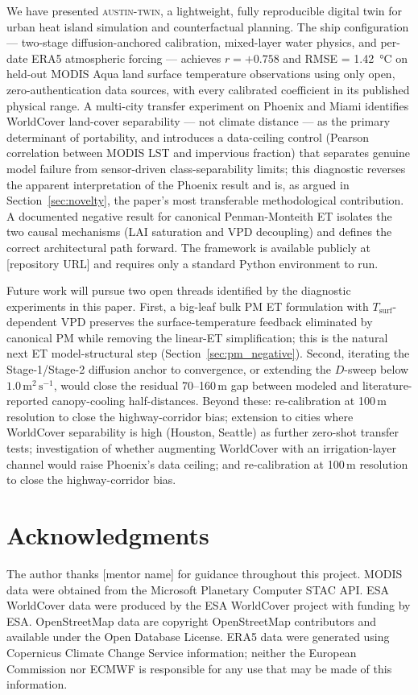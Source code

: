 \documentclass[12pt, letterpaper]{article}
\begin{document}
We have presented \textsc{austin-twin}, a lightweight, fully reproducible
digital twin for urban heat island simulation and counterfactual planning.
The ship configuration — two-stage diffusion-anchored calibration, mixed-layer
water physics, and per-date ERA5 atmospheric forcing — achieves $r = +0.758$
and RMSE = \SI{1.42}{\degreeCelsius} on held-out MODIS Aqua land surface
temperature observations using only open, zero-authentication data sources,
with every calibrated coefficient in its published physical range. A
multi-city transfer experiment on Phoenix and Miami identifies WorldCover
land-cover separability — not climate distance — as the primary determinant
of portability, and introduces a data-ceiling control (Pearson correlation
between MODIS LST and impervious fraction) that separates genuine model
failure from sensor-driven class-separability limits; this diagnostic reverses
the apparent interpretation of the Phoenix result and is, as argued in
Section~\ref{sec:novelty}, the paper's most transferable methodological
contribution. A documented negative result for canonical Penman-Monteith ET
isolates the two causal mechanisms (LAI saturation and VPD decoupling) and
defines the correct architectural path forward. The framework is available
publicly at [repository URL] and requires only a standard Python environment
to run.

Future work will pursue two open threads identified by the diagnostic
experiments in this paper. First, a big-leaf bulk PM ET formulation with
$T_{\mathrm{surf}}$-dependent VPD preserves the surface-temperature
feedback eliminated by canonical PM while removing the linear-ET
simplification; this is the natural next ET model-structural step
(Section~\ref{sec:pm_negative}). Second, iterating the Stage-1/Stage-2
diffusion anchor to convergence, or extending the $D$-sweep below
$1.0\,\text{m}^2\,\text{s}^{-1}$, would close the residual 70--160\,m
gap between modeled and literature-reported canopy-cooling half-distances.
Beyond these: re-calibration at 100\,m resolution to close the
highway-corridor bias; extension to cities where WorldCover separability
is high (Houston, Seattle) as further zero-shot transfer tests; investigation
of whether augmenting WorldCover with an irrigation-layer channel would
raise Phoenix's data ceiling; and re-calibration at 100\,m resolution
to close the highway-corridor bias.

\section*{Acknowledgments}
The author thanks [mentor name] for guidance throughout this project.
MODIS data were obtained from the Microsoft Planetary Computer STAC API.
ESA WorldCover data were produced by the ESA WorldCover project with funding
by ESA. OpenStreetMap data are copyright OpenStreetMap contributors and
available under the Open Database License. ERA5 data were generated using
Copernicus Climate Change Service information; neither the European Commission
nor ECMWF is responsible for any use that may be made of this information.
\end{document}
